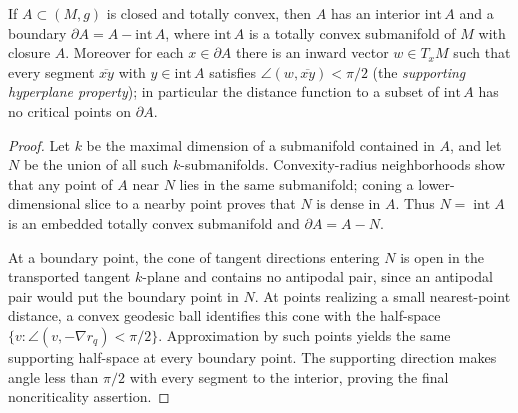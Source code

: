 \begin{lemma}
  \label{lem:pet-ch12-totally-convex-boundary-structure}

  If $A\subset(M,g)$ is closed and totally convex, then $A$ has an interior
  $\mathrm{int}\,A$ and a boundary $\partial A=A-\mathrm{int}\,A$, where
  $\mathrm{int}\,A$ is a totally convex submanifold of $M$ with closure $A$.
  Moreover for each $x\in\partial A$ there is an inward vector
  $w\in T_xM$ such that every segment $\overline{xy}$ with $y\in\mathrm{int}\,A$
  satisfies $\angle(w,\overline{xy})<\pi/2$ (the \emph{supporting hyperplane
  property}); in particular the distance function to a subset of
  $\mathrm{int}\,A$ has no critical points on $\partial A$.
\end{lemma}
\begin{proof}
  \sketch
  Let \(k\) be the maximal dimension of a submanifold contained in \(A\), and
  let \(N\) be the union of all such \(k\)-submanifolds. Convexity-radius
  neighborhoods show that any point of \(A\) near \(N\) lies in the same
  submanifold; coning a lower-dimensional slice to a nearby point proves that
  \(N\) is dense in \(A\). Thus \(N=\operatorname{int}A\) is an embedded totally
  convex submanifold and \(\partial A=A-N\).

  At a boundary point, the cone of tangent directions entering \(N\) is open in
  the transported tangent \(k\)-plane and contains no antipodal pair, since an
  antipodal pair would put the boundary point in \(N\). At points realizing a
  small nearest-point distance, a convex geodesic ball identifies this cone with
  the half-space \(\{v:\angle(v,-\nabla r_q)<\pi/2\}\). Approximation by such
  points yields the same supporting half-space at every boundary point. The
  supporting direction makes angle less than \(\pi/2\) with every segment to
  the interior, proving the final noncriticality assertion.
\end{proof}

